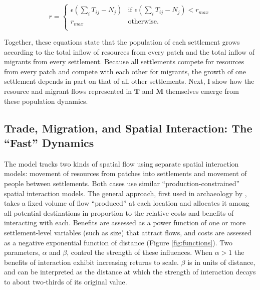 \documentclass{article}
\begin{document}
\begin{equation}
r =
  \begin{cases} 
      \epsilon \left(\sum_i T_{ij} -  N_j \right) & \text{if }\epsilon \left(\sum_i T_{ij} -  N_j\right) < r_{\mathit{max}} \\
      r_{\mathit{max}} & \text{otherwise}.\\
   \end{cases}
\end{equation}

Together, these equations state that the population of each settlement grows according to the total inflow of resources from every patch and the total inflow of migrants from every settlement. Because all settlements compete for resources from every patch and compete with each other for migrants, the growth of one settlement depends in part on that of all other settlements. Next, I show how the resource and migrant flows represented in $\mathbf{T}$ and $\mathbf{M}$ themselves emerge from these population dynamics.

\subsection{Trade, Migration, and Spatial Interaction: The ``Fast'' Dynamics}

The model tracks two kinds of spatial flow using separate spatial interaction models: movement of resources from patches into settlements and movement of people between settlements. Both cases use similar ``production-constrained'' spatial interaction models. The general approach, first used in archaeology by \textcite{Rihll1991}, takes a fixed volume of flow ``produced'' at each location and allocates it among all potential destinations in proportion to the relative costs and benefits of interacting with each. Benefits are assessed as a power function of one or more settlement-level variables (such as size) that attract flows, and costs are assessed as a negative exponential function of distance (Figure \ref{fig:functions}). Two parameters, $\alpha$ and $\beta$, control the strength of these influences. When $\alpha > 1$ the benefits of interaction exhibit increasing returns to scale. $\beta$ is in units of distance, and can be interpreted as the distance at which the strength of interaction decays to about two-thirds of its original value.
\end{document}
